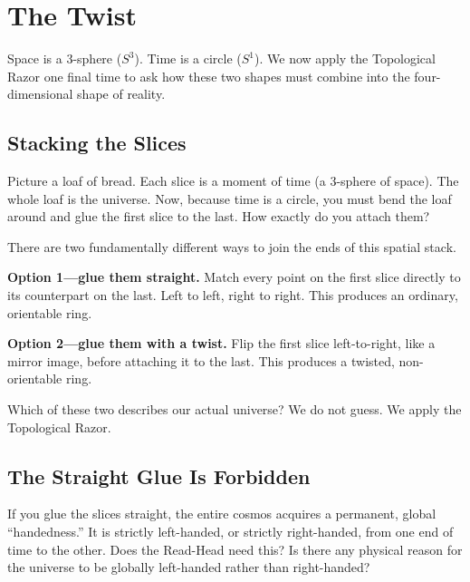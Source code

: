 \documentclass[11pt]{article}
\theoremstyle{canonstyle}
\providecommand{\Sone}{S^1}
\providecommand{\Sthree}{S^3}
\begin{document}
\newpage

\section{The Twist}

Space is a 3-sphere ($\Sthree$). Time is a circle ($\Sone$). We now apply the Topological Razor one final time to ask how these two shapes must combine into the four-dimensional shape of reality.

\subsection{Stacking the Slices}

\begin{reflect}
Picture a loaf of bread. Each slice is a moment of time (a 3-sphere of space). The whole loaf is the universe. Now, because time is a circle, you must bend the loaf around and glue the first slice to the last. How exactly do you attach them?
\end{reflect}

There are two fundamentally different ways to join the ends of this spatial stack.

\textbf{Option 1---glue them straight.} Match every point on the first slice directly to its counterpart on the last. Left to left, right to right. This produces an ordinary, orientable ring.

\textbf{Option 2---glue them with a twist.} Flip the first slice left-to-right, like a mirror image, before attaching it to the last. This produces a twisted, non-orientable ring.

Which of these two describes our actual universe? We do not guess. We apply the Topological Razor.

\subsection{The Straight Glue Is Forbidden}

\begin{reflect}
If you glue the slices straight, the entire cosmos acquires a permanent, global ``handedness.'' It is strictly left-handed, or strictly right-handed, from one end of time to the other. Does the Read-Head need this? Is there any physical reason for the universe to be globally left-handed rather than right-handed?
\end{reflect}
\end{document}
